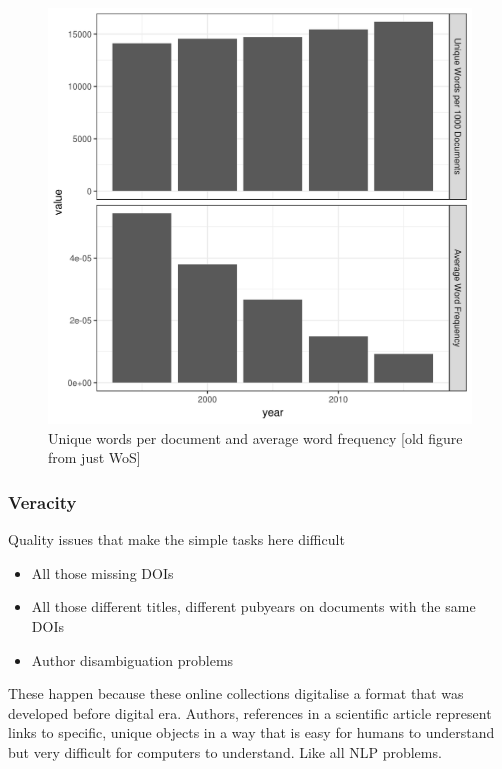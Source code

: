 \documentclass{article}
\begin{document}
\begin{figure}
\includegraphics[width=\linewidth]{plots/variety}
\caption{Unique words per document and average word frequency [old figure from just WoS]}
\label{variety}
\end{figure}

\subsubsection*{Veracity}
Quality issues that make the simple tasks here difficult
\begin{itemize}
	\item All those missing DOIs
    \item All those different titles, different pubyears on documents with the same DOIs
    \item Author disambiguation problems
\end{itemize}
These happen because these online collections digitalise a format that was developed before digital era. Authors, references in a scientific article represent links to specific, unique objects in a way that is easy for humans to understand but very difficult for computers to understand. Like all NLP problems.
\end{document}
